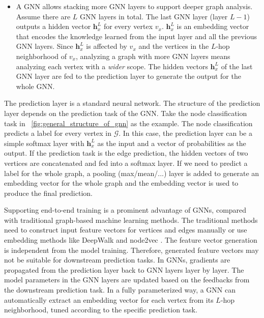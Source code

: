 \begin{itemize}
    \item   A GNN allows stacking more GNN layers to support deeper graph analysis.
    Assume there are $L$ GNN layers in total.
    The last GNN layer (layer $L-1$) outputs a hidden vector $\boldsymbol{h}^{L}_x$ for every vertex $v_x$.
    $\boldsymbol{h}^L_x$ is an embedding vector that encodes the knowledge learned from the input layer and all the previous GNN layers.
    Since $\boldsymbol{h}^L_x$ is affected by $v_x$ and the vertices in the $L$-hop neighborhood of $v_x$, analyzing a graph with more GNN layers means analyzing each vertex with a \emph{wider} scope.
    The hidden vectors $\boldsymbol{h}^L_x$ of the last GNN layer are fed to the prediction layer to generate the output for the whole GNN.
\end{itemize}

The prediction layer is a standard neural network.
%
The structure of the prediction layer depends on the prediction task of the GNN.
%
Take the node classification task in \figurename~\ref{fig:general_structure_of_gnn} as the example.
%
The node classification predicts a label for every vertex in $\mathcal{G}$.
%
In this case, the prediction layer can be a simple softmax layer with $\boldsymbol{h}^L_x$ as the input and a vector of probabilities as the output.
%
If the prediction task is the edge prediction, the hidden vectors of two vertices are concatenated and fed into a softmax layer.
%
If we need to predict a label for the whole graph, a pooling (max/mean/...) layer is added to generate an embedding vector for the whole graph and the embedding vector is used to produce the final prediction.

Supporting end-to-end training is a prominent advantage of GNNs, compared with traditional graph-based machine learning methods.
The traditional methods need to construct input feature vectors for vertices and edges manually or use embedding methods like DeepWalk \cite{bryan2014_deepwalk} and node2vec \cite{aditya2016_node2vec}.
The feature vector generation is independent from the model training.
Therefore, generated feature vectors may not be suitable for downstream prediction tasks.
In GNNs, gradients are propagated from the prediction layer back to GNN layers layer by layer. 
The model parameters in the GNN layers are updated based on the feedbacks from the downstream prediction task. 
In a fully parameterized way, a GNN can automatically extract an embedding vector for each vertex from its $L$-hop neighborhood, tuned according to the specific prediction task.

